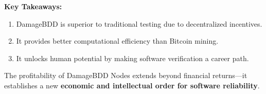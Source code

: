 \documentclass[a4paper,12pt]{article}
\begin{document}
\textbf{Key Takeaways:}
\begin{enumerate}
    \item DamageBDD is superior to traditional testing due to decentralized incentives.
    \item It provides better computational efficiency than Bitcoin mining.
    \item It unlocks human potential by making software verification a career path.
\end{enumerate}

The profitability of DamageBDD Nodes extends beyond financial returns—it establishes a new \textbf{economic and intellectual order for software reliability}.
\end{document}
